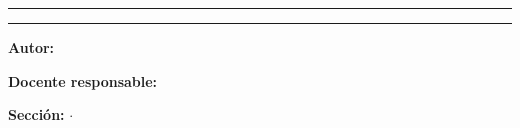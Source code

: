 \begin{titlepage}
  \centering
  \singlespacing

  {\large\bfseries \universidad\par}
  \vspace{0.35cm}
  {\normalsize \escuelaprofesional\par}
  \vspace{0.25cm}
  {\normalsize \asignatura\par}

  \vspace{1.4cm}
  \rule{\textwidth}{0.4pt}
  \vspace{0.9cm}

  {\LARGE\bfseries \titulotrabajo\par}
  \vspace{0.7cm}
  {\large \subtitulotrabajo\par}

  \vspace{0.9cm}
  \rule{\textwidth}{0.4pt}

  \vspace{1.6cm}
  {\normalsize
    \textbf{Autor:}\\[0.2cm]
    \autorproyecto\par}

  \vspace{1.0cm}
  {\normalsize
    \textbf{Docente responsable:}\\[0.2cm]
    \docente\par}

  \vspace{0.7cm}
  {\normalsize
    \textbf{Sección:} \seccion
    \quad$\cdot$\quad
    \grupo\par}

  \vfill

  {\normalsize \ciudad\par}
  \vspace{0.2cm}
  {\normalsize \periodo\par}
\end{titlepage}
